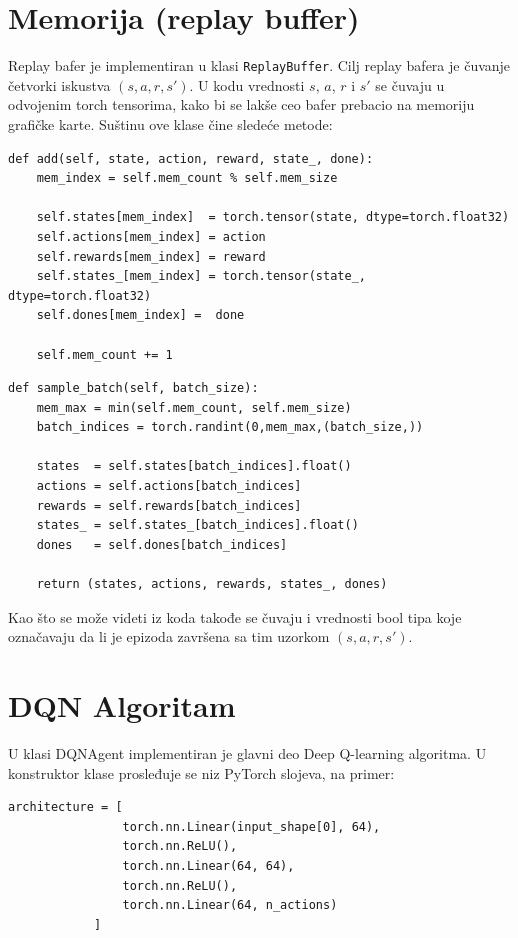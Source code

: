\documentclass[a4paper,fleqn,12pt]{JMThesis}
\theoremstyle{plain}
\theoremstyle{definition}
\theoremstyle{definition}
\begin{document}
\section{Memorija (replay buffer)}
Replay bafer je implementiran u klasi \texttt{ReplayBuffer}. Cilj replay bafera je čuvanje četvorki iskustva $(s,a,r,s')$.
U kodu vrednosti $s$, $a$, $r$ i $s'$ se čuvaju u odvojenim torch tensorima, kako bi se lakše ceo bafer prebacio na memoriju grafičke karte.
Suštinu ove klase čine sledeće metode:
\begin{verbatim}
def add(self, state, action, reward, state_, done):
	mem_index = self.mem_count % self.mem_size
	
	self.states[mem_index]  = torch.tensor(state, dtype=torch.float32)
	self.actions[mem_index] = action
	self.rewards[mem_index] = reward
	self.states_[mem_index] = torch.tensor(state_, dtype=torch.float32)
	self.dones[mem_index] =  done

	self.mem_count += 1
\end{verbatim}
\begin{verbatim}
def sample_batch(self, batch_size):
	mem_max = min(self.mem_count, self.mem_size)
	batch_indices = torch.randint(0,mem_max,(batch_size,))

	states  = self.states[batch_indices].float()
	actions = self.actions[batch_indices]
	rewards = self.rewards[batch_indices]
	states_ = self.states_[batch_indices].float()
	dones   = self.dones[batch_indices]

	return (states, actions, rewards, states_, dones)
\end{verbatim}
Kao što se može videti iz koda takođe se čuvaju i vrednosti bool tipa koje označavaju da li je epizoda završena sa tim uzorkom $(s,a,r,s')$.
\section{DQN Algoritam}
U klasi DQNAgent implementiran je glavni deo Deep Q-learning algoritma.
U konstruktor klase prosleđuje se niz PyTorch slojeva, na primer:
\begin{verbatim}
architecture = [
                torch.nn.Linear(input_shape[0], 64),
                torch.nn.ReLU(),
                torch.nn.Linear(64, 64),
                torch.nn.ReLU(),
                torch.nn.Linear(64, n_actions)
            ]
\end{verbatim}
\end{document}
